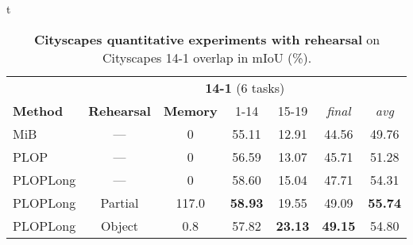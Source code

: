 t\begin{table}[t]
    \centering
    \begin{adjustbox}{max width=\textwidth}
        \begin{tabular}{@{}l|cc|cccc@{}}
            \toprule
                                                                       & \multicolumn{6}{c}{\textbf{14-1} (6 tasks)}                                                                                       \\
            \textbf{Method}                                            & \textbf{Rehearsal}                          & \textbf{Memory} & 1-14           & 15-19          & \textit{final} & \textit{avg}   \\
            \midrule
            MiB \scriptsize{\citep{cermelli2020modelingthebackground}} & ---                                         & 0               & 55.11          & 12.91          & 44.56          & 49.76          \\
            PLOP                                                       & ---                                         & 0               & 56.59          & 13.07          & 45.71          & 51.28          \\
            PLOPLong                                                   & ---                                         & 0               & 58.60          & 15.04          & 47.71          & 54.31          \\
            PLOPLong                                                   & Partial                                     & 117.0           & \textbf{58.93} & 19.55          & 49.09          & \textbf{55.74} \\
            PLOPLong                                                   & Object                                      & 0.8             & 57.82          & \textbf{23.13} & \textbf{49.15} & 54.80          \\
            \bottomrule
        \end{tabular}
    \end{adjustbox}
    \caption{\textbf{Cityscapes quantitative experiments with rehearsal} on Cityscapes 14-1 overlap in \ac{mIoU} (\%).}
    \label{tab:seg_cityscapes_rehearsal}
\end{table}
